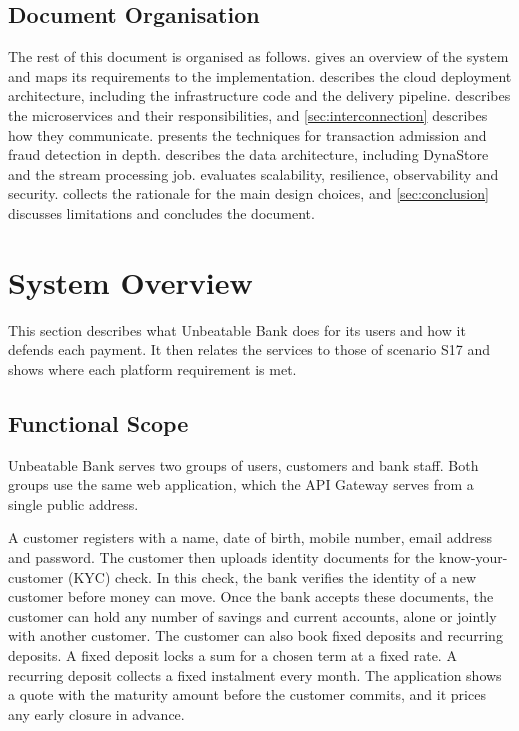 \documentclass[11pt,a4paper]{article}
\newcommand{\project}{Unbeatable Bank}
\begin{document}
\subsection{Document Organisation}
\label{sec:organisation}

The rest of this document is organised as follows.  gives an overview of the system and maps its requirements to the implementation.  describes the cloud deployment architecture, including the infrastructure code and the delivery pipeline.  describes the microservices and their responsibilities, and \cref{sec:interconnection} describes how they communicate.  presents the techniques for transaction admission and fraud detection in depth.  describes the data architecture, including DynaStore and the stream processing job.  evaluates scalability, resilience, observability and security.  collects the rationale for the main design choices, and \cref{sec:conclusion} discusses limitations and concludes the document.

\section{System Overview}
\label{sec:overview}

This section describes what \project{} does for its users and how it defends each payment. It then relates the services to those of scenario S17 and shows where each platform requirement is met.

\subsection{Functional Scope}
\label{sec:scope}

\project{} serves two groups of users, customers and bank staff. Both groups use the same web application, which the API Gateway serves from a single public address.

A customer registers with a name, date of birth, mobile number, email address and password. The customer then uploads identity documents for the know-your-customer (KYC) check. In this check, the bank verifies the identity of a new customer before money can move. Once the bank accepts these documents, the customer can hold any number of savings and current accounts, alone or jointly with another customer. The customer can also book fixed deposits and recurring deposits. A fixed deposit locks a sum for a chosen term at a fixed rate. A recurring deposit collects a fixed instalment every month. The application shows a quote with the maturity amount before the customer commits, and it prices any early closure in advance.
\end{document}
